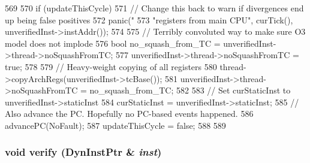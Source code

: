 \begin{DoxyCode}
569 {
570     if (updateThisCycle) {
571         // Change this back to warn if divergences end up being false positives
572         panic("%
573              "registers from main CPU", curTick(), unverifiedInst->instAddr());
574 
575         // Terribly convoluted way to make sure O3 model does not implode
576         bool no_squash_from_TC = unverifiedInst->thread->noSquashFromTC;
577         unverifiedInst->thread->noSquashFromTC = true;
578 
579         // Heavy-weight copying of all registers
580         thread->copyArchRegs(unverifiedInst->tcBase());
581         unverifiedInst->thread->noSquashFromTC = no_squash_from_TC;
582 
583         // Set curStaticInst to unverifiedInst->staticInst
584         curStaticInst = unverifiedInst->staticInst;
585         // Also advance the PC.  Hopefully no PC-based events happened.
586         advancePC(NoFault);
587         updateThisCycle = false;
588     }
589 }
\end{DoxyCode}
\hypertarget{classChecker_af7588193b0187186501d440f02645196}{
\subsubsection[{verify}]{\setlength{\rightskip}{0pt plus 5cm}void verify ({\bf DynInstPtr} \& {\em inst})}}
\label{classChecker_af7588193b0187186501d440f02645196}




